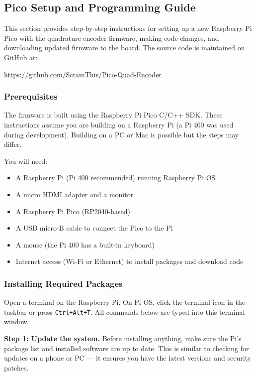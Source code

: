 \documentclass[main.tex]{subfiles}
\begin{document}
\subsection{Pico Setup and Programming Guide}
\label{sec:pico_setup}

This section provides step-by-step instructions for setting up a new Raspberry Pi Pico with the quadrature encoder firmware, making code changes, and downloading updated firmware to the board. The source code is maintained on GitHub at:

\begin{center}
\url{https://github.com/ScramThis/Pico-Quad-Encoder}
\end{center}

\subsubsection{Prerequisites}

The firmware is built using the Raspberry Pi Pico C/C++ SDK. These instructions assume you are building on a Raspberry Pi (a Pi 400 was used during development). Building on a PC or Mac is possible but the steps may differ.

You will need:
\begin{itemize}
    \item A Raspberry Pi (Pi 400 recommended) running Raspberry Pi OS
    \item A micro HDMI adapter and a monitor
    \item A Raspberry Pi Pico (RP2040-based)
    \item A USB micro-B cable to connect the Pico to the Pi
    \item A mouse (the Pi 400 has a built-in keyboard)
    \item Internet access (Wi-Fi or Ethernet) to install packages and download code
\end{itemize}

\subsubsection{Installing Required Packages}

Open a terminal on the Raspberry Pi. On Pi OS, click the terminal icon in the taskbar or press \texttt{Ctrl+Alt+T}. All commands below are typed into this terminal window.

\vspace{6pt}
\noindent \textbf{Step 1: Update the system.} Before installing anything, make sure the Pi's package list and installed software are up to date. This is similar to checking for updates on a phone or PC --- it ensures you have the latest versions and security patches.
\end{document}
